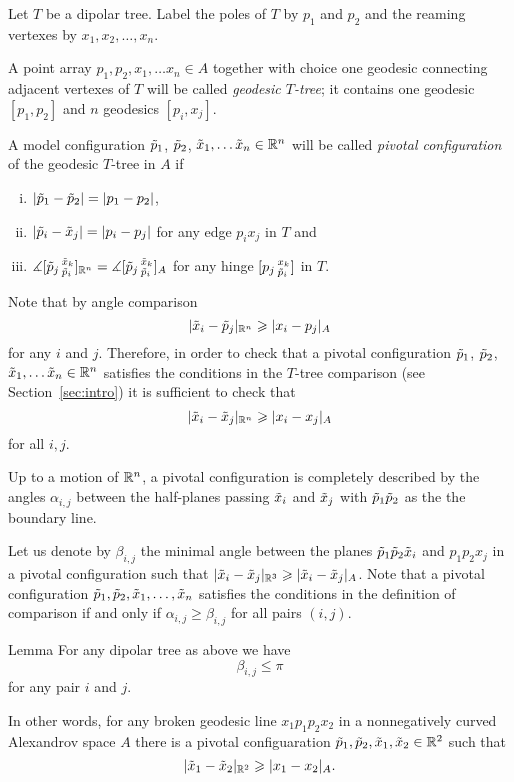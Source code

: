 Let $T$ be a dipolar tree.
Label the poles of $T$ by $p_1$ and $p_2$ and the reaming vertexes by $x_1,x_2,\dots,x_n$.

A point array $p_1,p_2,x_1,\dots x_n\in A$ together with choice one geodesic connecting adjacent vertexes of $T$ will be called \emph{geodesic $T$-tree};
it contains one geodesic $[p_1,p_2]$ and $n$ geodesics  $[p_i,x_j]$.

A model configuration $\~p_1$, $\~p_2$, $\~x_1,\dots\~x_n\in \RR^n$ will be called \emph{pivotal configuration} of the geodesic $T$-tree in $A$
if 
\begin{enumerate}[(i)]
\item $|\~p_1-\~p_2|= |p_1-p_2|$,
\item $|\~p_i-\~x_j|= |p_i-p_j|$ for any edge $p_ix_j$ in $T$ and
\item $\measuredangle[\~p_j\,^{\~x_k}_{\~p_i}]_{\RR^n}=\measuredangle[\~p_j\,^{\~x_k}_{\~p_i}]_A$
for any hinge  $[p_j\,^{x_k}_{\~p_i}]$ in $T$.
\end{enumerate}

Note that by angle comparison 
\[|\~x_i-\~p_j|_{\RR^n}\ge |x_i-p_j|_A\]
for any $i$ and $j$.
Therefore, in order to check that a pivotal configuration $\~p_1$, $\~p_2$, $\~x_1,\dots\~x_n\in \RR^n$ satisfies the conditions in the $T$-tree comparison (see Section~\ref{sec:intro}) it is sufficient to check that 
\[|\~x_i-\~x_j|_{\RR^n}\ge |x_i-x_j|_A\]
for all $i,j$.

Up to a motion of $\RR^n$, a pivotal configuration is completely described by the angles $\alpha_{i,j}$ between the half-planes passing $\~x_i$ and $\~x_j$ with $\~p_1 \~p_2$ as the the boundary line.

Let us denote by $\beta_{i,j}$ the minimal angle between the planes $\~p_1 \~p_2 \~x_i$ and $p_1p_2 x_j$ in a pivotal configuration such that $|\~x_i-\~x_j|_{\RR^3}\ge|\~x_i-\~x_j|_A$. 
Note that a pivotal  configuration $\~p_1,\~p_2,\~x_1,\dots,\~x_n$ satisfies the conditions in the definition of comparison if and only if $\alpha_{i,j}\ge \beta_{i,j}$ for all pairs $(i,j)$.


\begin{thm}{Lemma}\label{|x-x|}
For any dipolar tree as above we have 
\[\beta_{i,j}\le \pi\]
for any pair $i$ and $j$.

In other words, for any broken geodesic line $x_1p_1p_2x_2$ in a nonnegatively curved Alexandrov space $A$ there is a pivotal configuaration $\~p_1,\~p_2,\~x_1,\~x_2\in \RR^2$ such that 
\[|\~x_1-\~x_2|_{\RR^2}\ge |x_1-x_2|_A.\]

\end{thm}

